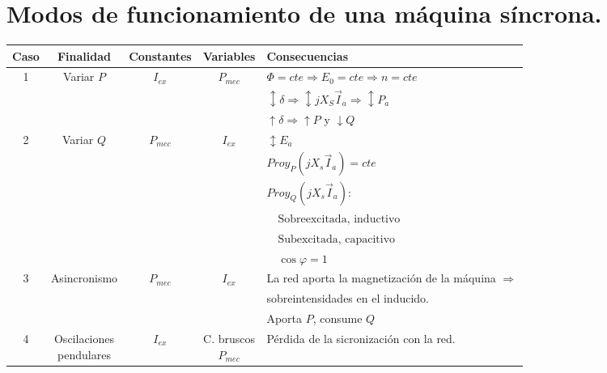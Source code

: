 	\section{Modos de funcionamiento de una máquina síncrona.}
		\begin{table}[H]
			\centering
			\renewcommand{\arraystretch}{1.1}
			\begin{tabular}{ccccl}
				\textbf{Caso} & \textbf{Finalidad} & \textbf{Constantes} & \textbf{Variables} & \textbf{Consecuencias}\\
				\hline
				\multirow{3}{*}{1} & \multirow{3}{*}{Variar $P$}   & \multirow{3}{*}{$I_{ex}$}  & \multirow{3}{*}{$P_{mec}$}  & $\Phi = cte \Rightarrow E_0 = cte \Rightarrow n = cte$ \\
				&              &           &            & $\updownarrow\delta\Rightarrow\updownarrow jX_S\vec{I}_a\Rightarrow\updownarrow P_a$ \\
				&              &           &            & $\uparrow\delta \Rightarrow\uparrow P\text{ y }\downarrow Q$ \\\hline
				\multirow{6}{*}{2} & \multirow{6}{*}{Variar $Q$}   & \multirow{6}{*}{$P_{mec}$} & \multirow{6}{*}{$I_{ex}$}   & $\updownarrow E_a$ \\
				&              &           &            & $Proy_P(jX_s\vec{I}_a) = cte$ \\
				&              &           &            & $Proy_Q(jX_s\vec{I}_a)$: \\
				&              &           &            & $\quad\text{Sobreexcitada, inductivo}$ \\
				&              &           &            & $\quad\text{Subexcitada, capacitivo}$ \\
				&              &           &            & $\quad\cos{\varphi} = 1$ \\\hline
				\multirow{3}{*}{3} & \multirow{3}{*}{Asincronismo} & \multirow{3}{*}{$P_{mec}$} & \multirow{3}{*}{$I_{ex}$}   & La red aporta la magnetización de la máquina $\Rightarrow$ \\
				&              &           &            & sobreintensidades en el inducido. \\
				&              &           &            & Aporta $P$, consume $Q$ \\\hline
				\multirow{3}{*}{4} & \multirow{3}{*}{\parbox{2cm}{\centering Oscilaciones\\pendulares}} & \multirow{3}{*}{$I_{ex}$}  & \multirow{3}{*}{\parbox{2cm}{\centering C. bruscos\\$P_{mec}$}} & Pérdida de la sicronización con la red. \\

\end{tabular}
\end{table}
